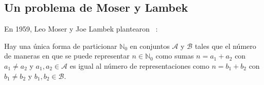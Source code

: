\subsection{Un problema de Moser y Lambek}
\label{sec:Moser-Lambek}

  En 1959,
  Leo Moser y Joe Lambek plantearon~%
    \cite{novakovic07:_gener_func}:
  \begin{theorem}
    \label{theo:Moser-Lambek}
    Hay una única forma de particionar \(\mathbb{N}_0\)
    en conjuntos \(\mathcal{A}\) y \(\mathcal{B}\)
    tales que el número de maneras
    en que se puede representar \(n \in \mathbb{N}_0\)
    como sumas \(n = a_1 + a_2\)
    con \(a_1 \ne a_2\) y \(a_1, a_2 \in \mathcal{A}\)
    es igual al número de representaciones como
    \(n = b_1 + b_2\)
    con \(b_1 \ne b_2\) y \(b_1, b_2 \in \mathcal{B}\).
  \end{theorem}
